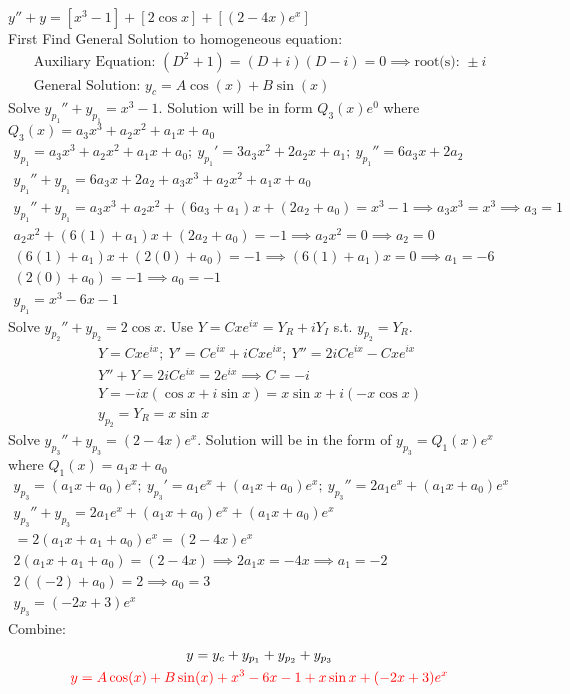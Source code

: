 \item [33.] $y'' + y = [x^3 - 1] + [2 \cos x] + [(2- 4x)e^x]$\\[2mm]
First Find General Solution to homogeneous equation:
\begin{gather*}
    \text{Auxiliary Equation: } (D^2+1)=(D+i)(D-i)=0
    \implies \text{root(s): } \pm i\\
    \text{General Solution: } y_c=A\cos (x)+B\sin (x) 
\end{gather*}
Solve $y_{p_1}''+y_{p_1}=x^3-1$. Solution will be in form $Q_3(x)e^{0}$ where $Q_3(x) = a_3x^3+a_2x^2+a_1x+a_0$
\begin{gather*}
    y_{p_1} = a_3x^3+a_2x^2+a_1x+a_0;\:
    y_{p_1}' = 3a_3x^2+2a_2x+a_1;\:
    y_{p_1}'' = 6a_3x+2a_2\\
    y_{p_1}''+y_{p_1} = 6a_3x+2a_2+a_3x^3+a_2x^2+a_1x+a_0\\
    y_{p_1}''+y_{p_1} = a_3x^3+a_2x^2+(6a_3+a_1)x+(2a_2+a_0) = x^3-1 \implies 
    a_3x^3 = x^3 \implies a_3 = 1\\
    a_2x^2+(6(1)+a_1)x+(2a_2+a_0) = -1\implies
    a_2x^2 = 0 \implies a_2 = 0\\
    (6(1)+a_1)x+(2(0)+a_0) = -1 \implies
    (6(1)+a_1)x = 0 \implies a_1 = -6\\
    (2(0)+a_0) = -1 \implies a_0 = -1\\
    y_{p_1} = x^3-6x-1  
\end{gather*}
Solve $y_{p_2}''+y_{p_2}=2\cos x$. Use $Y=Cxe^{ix}=Y_R + iY_I$ s.t. $y_{p_2} = Y_R$.
\begin{gather*}
    Y=Cxe^{ix};\:Y'=Ce^{ix}+iCxe^{ix};\:Y''=2iCe^{ix}-Cxe^{ix}\\
    Y''+Y=2iCe^{ix}=2e^{ix} \implies C=-i\\
    Y = -ix(\cos x+ i\sin x) = x \sin x +i(-x\cos x)\\
    y_{p_2} = Y_R =  x \sin x
\end{gather*}
Solve $y_{p_3}''+y_{p_3}=(2-4x)e^x$. Solution will be in the form of  $y_{p_3}=Q_1(x)e^x$ where $Q_1(x) = a_1x+a_0$
\begin{gather*}
    y_{p_3} = (a_1x+a_0)e^x;\:y_{p_3}' = a_1e^x+(a_1x+a_0)e^x;\:y_{p_3}'' = 2a_1e^x+(a_1x+a_0)e^x\\
    y_{p_3}''+y_{p_3} = 2a_1e^x+(a_1x+a_0)e^x+(a_1x+a_0)e^x\\
    =2(a_1x+a_1+a_0)e^x = (2-4x)e^x\\ 2(a_1x+a_1+a_0) = (2-4x) \implies 2a_1x=-4x \implies a_1=-2\\
    2((-2)+a_0) = 2 \implies a_0 = 3\\
    y_{p_3}=(-2x+3)e^x
\end{gather*}
Combine:
\begin{gather*}
    y = y_c+y_{p_1}+y_{p_2}+y_{p_3}\\
    \textcolor{red}{y = 
    A\cos (x)+B\sin (x) 
    +x^3-6x-1  
    +x \sin x
    +(-2x+3)e^x}
\end{gather*}
